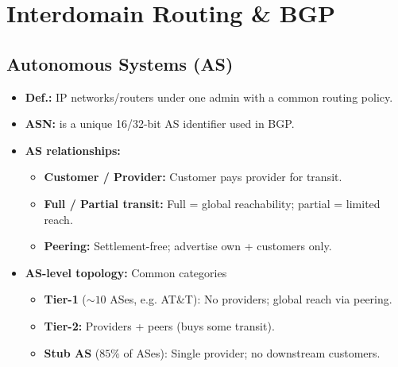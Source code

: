 \section{Interdomain Routing \& BGP}

\subsection{Autonomous Systems (AS)}
\begin{itemize}
    \item \textbf{Def.:} IP networks/routers under one admin with a common routing policy.
    \item \textbf{ASN:} is a unique 16/32-bit AS identifier used in BGP.
    \item \textbf{AS relationships:}
    \begin{itemize}
        \item \textbf{Customer / Provider:} Customer pays provider for transit.
        \item \textbf{Full / Partial transit:} Full = global reachability; partial = limited reach.
        \item \textbf{Peering:} Settlement-free; advertise own + customers only.
    \end{itemize}
    \item \textbf{AS-level topology:} Common categories
    \begin{itemize}
        \item \textbf{Tier-1} ($\sim 10$ ASes, e.g. AT\&T): No providers; global reach via peering.
        \item \textbf{Tier-2:} Providers + peers (buys some transit).
        \item \textbf{Stub AS} ($85\%$ of ASes): Single provider; no downstream customers.
    \end{itemize}
\end{itemize}


